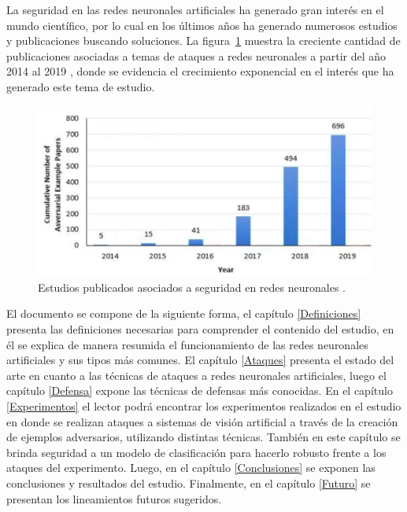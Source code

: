 La seguridad en las redes neuronales artificiales ha generado gran interés en el mundo científico, por lo cual en los últimos años ha generado numerosos estudios y publicaciones buscando soluciones. La figura~\ref{fig:estudios} muestra la creciente cantidad de publicaciones asociadas a temas de ataques a redes neuronales a partir del año 2014 al 2019 \parencite{r62}, donde se evidencia el crecimiento exponencial en el interés que ha generado este tema de estudio.

\begin{figure}[th]
\centering
\includegraphics{Figures/figura_01.PNG}
\decoRule
\caption[Estudios publicados]{Estudios publicados asociados a seguridad en redes neuronales \parencite{r62}.}
\label{fig:estudios}
\end{figure}

El documento se compone de la siguiente forma, el capítulo \ref{Definiciones} presenta las definiciones necesarias para comprender el contenido del estudio, en él se explica de manera resumida el funcionamiento de las redes neuronales artificiales y sus tipos más comunes. El capítulo \ref{Ataques} presenta el estado del arte en cuanto a las técnicas de ataques a redes neuronales artificiales, luego el capítulo \ref{Defensa} expone las técnicas de defensas más conocidas. En el capítulo \ref{Experimentos} el lector podrá encontrar los experimentos realizados en el estudio en donde se realizan ataques a sistemas de visión artificial a través de la creación de ejemplos adversarios, utilizando distintas técnicas. También en este capítulo se brinda seguridad a un modelo de clasificación para hacerlo robusto frente a los ataques del experimento. Luego, en el capítulo \ref{Conclusiones} se exponen las conclusiones y resultados del estudio. Finalmente, en el capítulo \ref{Futuro} se presentan los lineamientos futuros sugeridos.



